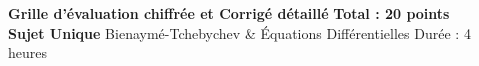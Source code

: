 \documentclass[a4paper,11pt]{article}
\begin{document}
\begin{tcolorbox}[
    enhanced,
    colback=bleufond,
    colframe=bleuprimaire,
    arc=1.6mm,
    boxrule=0.8pt,
    top=4pt, bottom=4pt, left=8pt, right=8pt
]
    \textbf{\Large\textcolor{bleuprimaire}{Grille d'évaluation chiffrée et Corrigé détaillé}} \hfill \textbf{\Large\textcolor{bleuprimaire}{Total : 20 points}} \\[0.15em]
    \textbf{\textcolor{bleusecondaire}{Sujet Unique}} \hspace{0.2cm}\textcolor{grisaccent}{\textbullet}\hspace{0.2cm} \textcolor{grisaccent}{Bienaymé-Tchebychev & Équations Différentielles} \hfill \small\textcolor{grisaccent}{Durée : 4 heures}
\end{tcolorbox}

\vspace{0.10cm}
\end{document}
